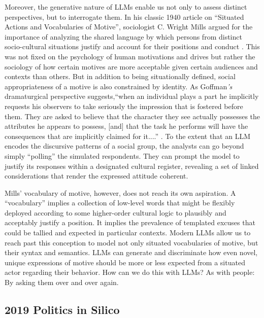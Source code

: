 \documentclass{article} %
\begin{document}
Moreover, the generative nature of LLMs enable us not only to assess
distinct perspectives, but to interrogate them. In his classic 1940
article on ``Situated Actions and Vocabularies of Motive'', sociologist
C. Wright Mills argued for the importance of analyzing the shared
language by which persons from distinct socio-cultural situations
justify and account for their positions and conduct
\parencite{Mills1940-xp}. This was not
fixed on the psychology of human motivations and drives but rather the
sociology of how certain motives are more acceptable given certain
audiences and contexts than others. But in addition to being
situationally defined, social appropriateness of a motive is also
constrained by identity. As Goffman\emph{'s} dramaturgical perspective
suggests,``when an individual plays a part he implicitly requests his
observers to take seriously the impression that is fostered before them.
They are asked to believe that the character they see actually possesses
the attributes he appears to possess, {[}and{]} that the task he
performs will have the consequences that are implicitly claimed for
it....'' \parencite{Goffman2021-xf}. To the extent that an LLM encodes the discursive patterns of a
social group, the analysts can go beyond simply ``polling'' the
simulated respondents. They can prompt the model to justify its
responses within a designated cultural register, revealing a set of
linked considerations that render the expressed attitude coherent.

Mills' vocabulary of motive, however, does not reach its own aspiration.
A ``vocabulary'' implies a collection of low-level words that might be
flexibly deployed according to some higher-order cultural logic to
plausibly and acceptably justify a position. It implies the prevalence
of templated excuses that could be tallied and expected in particular
contexts. Modern LLMs allow us to reach past this conception to model
not only situated vocabularies of motive, but their syntax and
semantics. LLMs can generate and discriminate how even novel, unique
expressions of motive should be more or less expected from a situated
actor regarding their behavior. How can we do this with LLMs? As with
people: By asking them over and over again.

\subsection*{2019 Politics in Silico}
\end{document}
